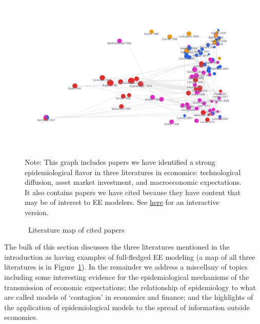 \begin{figure}[!ht] \centering  %
  \caption{ ~Literature map of cited papers}
  \label{fig:graph_mixer}
  \centerline{\includegraphics[width=1.5\textwidth]{./figures/graph_mixer}}
  \begin{flushleft}
    {\footnotesize Note: This graph includes papers we have identified a strong epidemiological flavor in three literatures in economics: technological diffusion, asset market investment, and macroeconomic expectations.  It also contains papers we have cited because they have content that may be of interest to EE modelers. See \href{https://app.litmaps.co/shared/F3D33DB4-28AA-42AB-ADD9-F94682D1C9CF}{here} for an interactive version.}
  \end{flushleft}
\end{figure}

The bulk of this section discusses the three literatures mentioned in the introduction as having examples of full-fledged EE modeling (a map of all three literatures is in Figure~\ref{fig:graph_mixer}).  In the remainder we address a miscellany of topics including some interesting evidence for the epidemiological mechanisms of the transmission of economic expectations; the relationship of epidemiology to what are called models of `contagion' in economics and finance; and the highlights of the application of epidemiological models to the spread of information outside economics.





